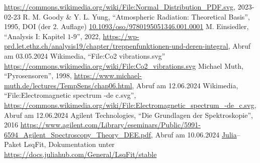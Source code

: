 \documentclass[12pt,a4paper]{scrartcl}
\numberwithin{equation}{section} %
\newcommand{\code}[1]{\textsf{#1}}
\begin{document}
\begin{thebibliography}{9}
	\url{https://commons.wikimedia.org/wiki/File:Normal_Distribution_PDF.svg},
	2023-02-23
	R. M. Goody \& Y. L. Yung, ``Atmospheric Radiation: Theoretical Basis'', 1995,
	DOI  (der 2. Auflage) \href{https://doi.org/10.1093/oso/9780195051346.001.0001}{10.1093/oso/9780195051346.001.0001}
	M. Einsiedler, ``Analysis I: Kapitel $1$-$9$'', 2022,
	\url{https://wp-prd.let.ethz.ch/analysis19/chapter/treppenfunktionen-und-deren-integral},
	Abruf am 03.05.2024
	Wikimedia, ``File:Co2 vibrations.svg''
	\url{https://commons.wikimedia.org/wiki/File:Co2_vibrations.svg}
	Michael Muth, ``Pyrosensoren'', 1998,
	\url{https://www.michael-muth.de/lectures/TempSens/chap06.html}, Abruf am 12.06.2024
	Wikimedia, ``File:Electromagnetic spectrum -de c.svg'',
	\url{https://commons.wikimedia.org/wiki/File:Electromagnetic_spectrum_-de_c.svg}, Abruf am 12.06.2024
	Agilent Technologies, ``Die Grundlagen der Spektroskopie'', 2016
	\url{https://www.agilent.com/Library/eseminars/Public/5991-6594_Agilent_Spectroscopy_Theory_DEE.pdf},
	Abruf am 10.06.2024
	\code{\href{https://julialang.org}{Julia}}--Paket \code{LsqFit},
	Dokumentation unter \url{https://docs.juliahub.com/General/LsqFit/stable}
\end{thebibliography}
\end{document}
